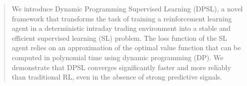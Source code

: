 \begin{abstract}
    We introduce Dynamic Programming Supervised Learning (DPSL), a novel framework that transforms the task of training a reinforcement learning agent in a deterministic intraday trading environment into a stable and efficient supervised learning (SL) problem. The loss function of the SL agent relies on an approximation of the optimal value function that can be computed in polynomial time using dynamic programming (DP). We demonstrate that DPSL converges significantly faster and more reliably than traditional RL, even in the absence of strong predictive signals.
\end{abstract}